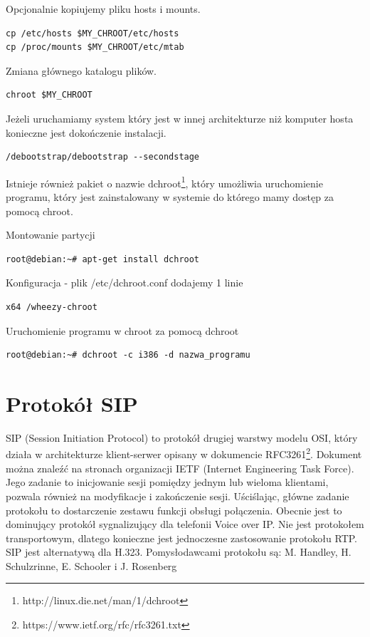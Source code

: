 Opcjonalnie kopiujemy pliku hosts i mounts.
\begin{lstlisting}
cp /etc/hosts $MY_CHROOT/etc/hosts
cp /proc/mounts $MY_CHROOT/etc/mtab
\end{lstlisting}

\newline  

Zmiana głównego katalogu plików.

\begin{lstlisting}
chroot $MY_CHROOT
\end{lstlisting}

Jeżeli uruchamiamy system który jest w innej architekturze niż komputer hosta konieczne jest dokończenie instalacji. 

\begin{lstlisting}
/debootstrap/debootstrap --secondstage
\end{lstlisting}

Istnieje również pakiet o nazwie dchroot\footnote{http://linux.die.net/man/1/dchroot}, który umożliwia uruchomienie programu, który jest zainstalowany w systemie do którego mamy dostęp za pomocą chroot.

Montowanie partycji
\begin{lstlisting}
root@debian:~# apt-get install dchroot 
\end{lstlisting}

\newline

Konfiguracja - plik /etc/dchroot.conf dodajemy 1 linie
\begin{lstlisting}
x64 /wheezy-chroot
\end{lstlisting}

\newline

Uruchomienie programu w chroot za pomocą dchroot
\begin{lstlisting}
root@debian:~# dchroot -c i386 -d nazwa_programu
\end{lstlisting}

\afterpage{\null\newpage}

\chapter{Protokół SIP}


SIP (Session Initiation Protocol) to protokół drugiej warstwy modelu OSI, który działa w architekturze klient-serwer opisany w dokumencie RFC3261\footnote{https://www.ietf.org/rfc/rfc3261.txt}. Dokument można znaleźć na stronach organizacji IETF (Internet Engineering Task Force). Jego zadanie to inicjowanie sesji pomiędzy jednym lub wieloma klientami,
pozwala również na modyfikacje i zakończenie sesji. Uściślając, główne zadanie protokołu to dostarczenie zestawu funkcji obsługi połączenia. Obecnie jest to dominujący protokół sygnalizujący dla telefonii Voice over IP. Nie jest protokołem transportowym, dlatego konieczne jest jednoczesne zastosowanie protokołu RTP. SIP jest alternatywą dla H.323. Pomysłodawcami protokołu są: M. Handley, H. Schulzrinne, E. Schooler i J. Rosenberg 

